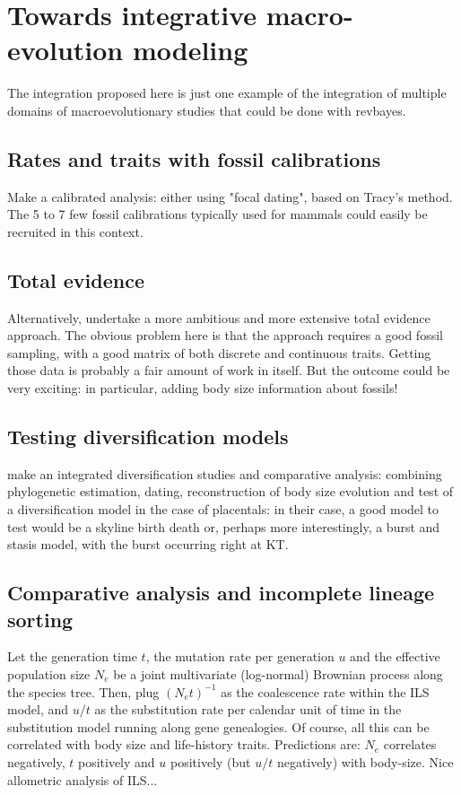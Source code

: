 \documentclass[11pt, oneside]{article}   	%
\begin{document}
\section{Towards integrative macro-evolution modeling}

The integration proposed here is just one example of the integration of multiple domains of macroevolutionary studies that could be done with revbayes.

\subsection{Rates and traits with fossil calibrations}

Make a calibrated analysis: either using "focal dating", based on Tracy's method. The 5 to 7 few fossil calibrations typically used for mammals could easily be recruited in this context.

\subsection{Total evidence}

Alternatively, undertake a more ambitious and more extensive total evidence approach. The obvious problem here is that the approach requires a good fossil sampling, with a good matrix of both discrete and continuous traits. Getting those data is probably a fair amount of work in itself. But the outcome could be very exciting: in particular, adding body size information about fossils!

\subsection{Testing diversification models}

make an integrated diversification studies and comparative analysis: combining phylogenetic estimation, dating, reconstruction of body size evolution and test of a diversification model in the case of placentals: in their case, a good model to test would be a skyline birth death or, perhaps more interestingly, a burst and stasis model, with the burst occurring right at KT.

\subsection{Comparative analysis and incomplete lineage sorting}

Let the generation time $t$, the mutation rate per generation $u$ and the effective population size $N_e$ be a joint multivariate (log-normal) Brownian process along the species tree. Then, plug $(N_e t)^{-1}$ as the coalescence rate within the ILS model, and $u / t$ as the substitution rate per calendar unit of time in the substitution model running along gene genealogies. Of course, all this can be correlated with body size and life-history traits. Predictions are: $N_e$ correlates negatively, $t$ positively and $u$ positively (but $u / t$ negatively) with body-size. Nice allometric analysis of ILS...
\end{document}
